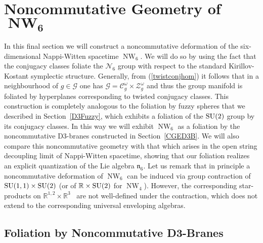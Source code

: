 \documentclass[11pt,a4paper]{article}
\DeclareMathOperator{\NW}{NW}
\newcommand{\mbf}[1]{{\boldsymbol {#1} }}
\newcommand{\newsection}{\setcounter{equation}{0}\section}
\newcommand{\real}{{\mathbb R}} %
\begin{document}
\newsection{Noncommutative Geometry of $\mbf{\NW_6}$\label{TDNC}}

In this final section we will construct a noncommutative deformation
of the six-dimensional Nappi-Witten spacetime $\NW_6$. We will do so
by using the fact that the conjugacy classes foliate the
$\mathcal{N}_6$ group with respect to the standard Kirillov-Kostant
symplectic structure. Generally, from (\ref{twistconjhom}) it follows
that in a neighbourhood of $g\in\mathcal{G}$ one has
$\mathcal{G}=\mathcal{C}_g^\omega\times\mathcal{Z}_g^\omega$ and thus
the group manifold is foliated by hyperplanes corresponding to twisted
conjugacy classes. This construction is completely analogous to the
foliation by fuzzy spheres that we described in Section~\ref{D3Fuzzy}, which
exhibits a foliation of the ${\rm SU}(2)$ group by its conjugacy
classes. In this way we will exhibit $\NW_6$ as a foliation by the
noncommutative D3-branes constructed in Section~\ref{CGED3B}. We will
also compare this noncommutative geometry with that which arises in
the open string decoupling limit of Nappi-Witten spacetime, showing
that our foliation realizes an explicit quantization of the Lie
algebra $\mathfrak{n}_6$. Let us remark that in principle a
noncommutative deformation of $\NW_6$ can be induced via group
contraction of ${\rm SU}(1,1)\times{\rm SU}(2)$ (or of
$\real\times{\rm SU}(2)$ for $\NW_4$). However, the corresponding
star-products on $\real^{1,2}\times\real^3$~\cite{G-BLMV1,HLS-J1,HNT1}
are not well-defined under the contraction, which does not extend to
the corresponding universal enveloping algebras.

\subsection{Foliation by Noncommutative D3-Branes\label{D3Fol}}
\end{document}
